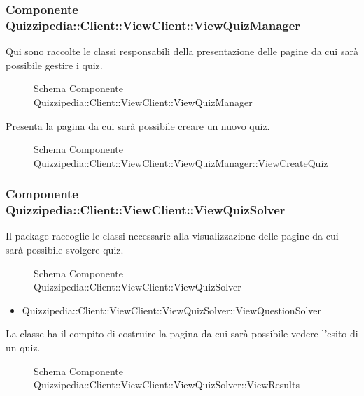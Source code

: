\subsubsection{Componente Quizzipedia::Client::ViewClient::ViewQuizManager}
Qui sono raccolte le classi responsabili della presentazione delle pagine da cui sarà possibile gestire i quiz.
\begin{figure}[H]
\centering
\noindent{}
\caption{Schema Componente Quizzipedia::Client::ViewClient::ViewQuizManager}
\end{figure}
Presenta la pagina da cui sarà possibile creare un nuovo quiz.
\begin{figure}[H]
\centering
\noindent{}
\caption{Schema Componente Quizzipedia::Client::ViewClient::ViewQuizManager::ViewCreateQuiz}
\end{figure}
\subsubsection{Componente Quizzipedia::Client::ViewClient::ViewQuizSolver}
Il package raccoglie le classi necessarie alla visualizzazione delle pagine da cui sarà possibile svolgere quiz.
\begin{figure}[H]
\centering
\noindent{}
\caption{Schema Componente Quizzipedia::Client::ViewClient::ViewQuizSolver}
\end{figure}
\begin{itemize}
\item Quizzipedia::Client::ViewClient::ViewQuizSolver::ViewQuestionSolver
\end{itemize}
La classe ha il compito di costruire la pagina da cui sarà possibile vedere l'esito di un quiz.
\begin{figure}[H]
\centering
\noindent{}
\caption{Schema Componente Quizzipedia::Client::ViewClient::ViewQuizSolver::ViewResults}
\end{figure}
